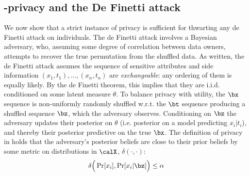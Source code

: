 \subsection{\name-privacy and the De Finetti attack}
\label{app:de finetti}
We now show that a strict instance of \name privacy is sufficient for thwarting any de Finetti attack \cite{definetti} on individuals. The de Finetti attack involves a Bayesian adversary, who, assuming some degree of correlation between data owners, attempts to recover the true permutation from the shuffled data. As written, the de Finetti attack assumes the sequence of sensitive attributes and side information $(x_1, t_1), \dots, (x_n, t_n)$ are \emph{exchangeable}: any ordering of them is equally likely. By the de Finetti theorem, this implies that they are i.i.d. conditioned on some latent measure $\theta$. To balance privacy with utility, the $\bx$ sequence is non-uniformly randomly shuffled w.r.t. the $\bt$ sequence producing a shuffled sequence $\bz$, which the adversary observes. Conditioning on $\bz$ the adversary updates their posterior on $\theta$ (i.e. posterior on a model predicting $x_i | t_i$), and thereby their posterior predictive on the true $\bx$. The definition of privacy in \cite{definetti} holds that the adversary's posterior beliefs are close to their prior beliefs by some metric on distributions in $\calX$, $\delta(\cdot, \cdot)$: 
\begin{align*}
    \delta\Big( \Pr[x_i], \Pr[x_i | \bz] \Big) \leq \alpha 
\end{align*}

